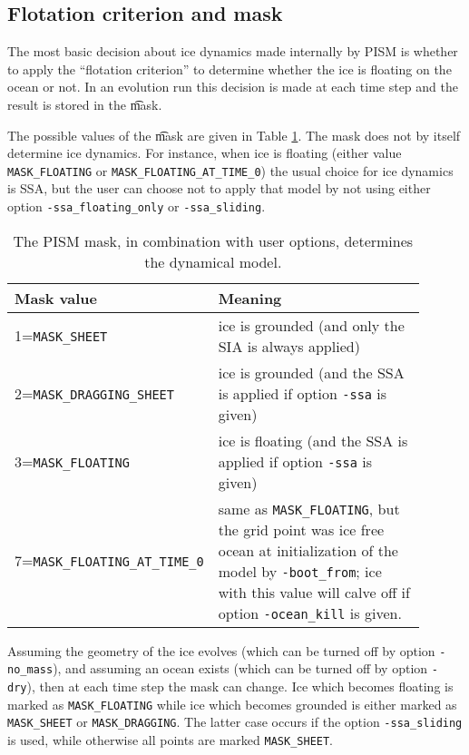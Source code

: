 \subsection{Flotation criterion and mask} \label{subsect:floatmask}  The most basic decision about ice dynamics made internally by PISM is whether to apply the ``flotation criterion'' to determine whether the ice is floating on the ocean or not.  In an evolution run this decision is made at each time step and the result is stored in the \t{mask}.

The possible values of the \t{mask} are given in Table \ref{tab:maskvals}.  The mask does not by itself determine ice dynamics.  For instance, when ice is floating (either value \texttt{MASK_FLOATING} or \texttt{MASK_FLOATING_AT_TIME_0}) the usual choice for ice dynamics is SSA, but the user can choose not to apply that model by not using either option \texttt{-ssa_floating_only} or \texttt{-ssa_sliding}.

\begin{table}[ht]
\centering
\caption{The PISM mask, in combination with user options, determines the dynamical model.}\label{tab:maskvals} 
\small
\begin{tabular}{p{0.25\linewidth}p{0.65\linewidth}}
\\\toprule
\textbf{Mask value} & \textbf{Meaning}\\\midrule
1=\texttt{MASK_SHEET} & ice is grounded (and only the SIA is always applied) \\
2=\texttt{MASK_DRAGGING_SHEET} & ice is grounded (and the SSA is applied if option \texttt{-ssa} is given) \\
3=\texttt{MASK_FLOATING} & ice is floating (and the SSA is applied if option \texttt{-ssa} is given) \\
7=\texttt{MASK_FLOATING_AT_TIME_0} & same as \texttt{MASK_FLOATING}, but the grid point was ice free ocean at initialization of the model by \texttt{-boot_from}; ice with this value will calve off if option \texttt{-ocean_kill} is given.
\\\bottomrule
\end{tabular}
\normalsize
\end{table}

Assuming the geometry of the ice evolves (which can be turned off by option \texttt{-no_mass}), and assuming an ocean exists (which can be turned off by option \texttt{-dry}), then at each time step the mask can change.  Ice which becomes floating is marked as \texttt{MASK_FLOATING} while ice which becomes grounded is either marked as \texttt{MASK_SHEET} or \texttt{MASK_DRAGGING}.  The latter case occurs if the option \texttt{-ssa_sliding} is used, while otherwise all points are marked \texttt{MASK_SHEET}.

